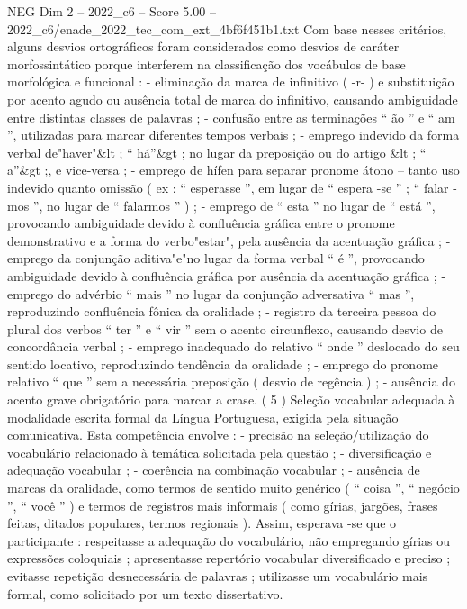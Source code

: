 \begin{textsample}{NEG Dim 2 – 2022\_c6 – Score 5.00 – 2022\_c6/enade\_2022\_tec\_com\_ext\_4bf6f451b1.txt}
Com base nesses critérios, alguns desvios ortográficos foram considerados como desvios de caráter morfossintático porque interferem na classificação dos vocábulos de base morfológica e funcional : - eliminação da marca de infinitivo ( -r- ) e substituição por acento agudo ou ausência total de marca do infinitivo, causando ambiguidade entre distintas classes de palavras ; - confusão entre as terminações “ ão ” e “ am ”, utilizadas para marcar diferentes tempos verbais ; - emprego indevido da forma verbal de"haver"\&lt ; “ há”\&gt ; no lugar da preposição ou do artigo \&lt ; “ a”\&gt ;, e vice-versa ; - emprego de hífen para separar pronome átono – tanto uso indevido quanto omissão ( ex : “ esperasse ”, em lugar de “ espera -se ” ; “ falar -mos ”, no lugar de “ falarmos ” ) ; - emprego de “ esta ” no lugar de “ está ”, provocando ambiguidade devido à confluência gráfica entre o pronome demonstrativo e a forma do verbo"estar", pela ausência da acentuação gráfica ; - emprego da conjunção aditiva"e"no lugar da forma verbal “ é ”, provocando ambiguidade devido à confluência gráfica por ausência da acentuação gráfica ; - emprego do advérbio “ mais ” no lugar da conjunção adversativa “ mas ”, reproduzindo confluência fônica da oralidade ; - registro da terceira pessoa do plural dos verbos “ ter ” e “ vir ” sem o acento circunflexo, causando desvio de concordância verbal ; - emprego inadequado do relativo “ onde ” deslocado do seu sentido locativo, reproduzindo tendência da oralidade ; - emprego do pronome relativo “ que ” sem a necessária preposição ( desvio de regência ) ; - ausência do acento grave obrigatório para marcar a crase. ( 5 ) Seleção vocabular adequada à modalidade escrita formal da Língua Portuguesa, exigida pela situação comunicativa.
Esta competência envolve : - precisão na seleção/utilização do vocabulário relacionado à temática solicitada pela questão ; - diversificação e adequação vocabular ; - coerência na combinação vocabular ; - ausência de marcas da oralidade, como termos de sentido muito genérico ( “ coisa ”, “ negócio ”, “ você ” ) e termos de registros mais informais ( como gírias, jargões, frases feitas, ditados populares, termos regionais ).
Assim, esperava -se que o participante : respeitasse a adequação do vocabulário, não empregando gírias ou expressões coloquiais ; apresentasse repertório vocabular diversificado e preciso ; evitasse repetição desnecessária de palavras ; utilizasse um vocabulário mais formal, como solicitado por um texto dissertativo.

\end{textsample}
